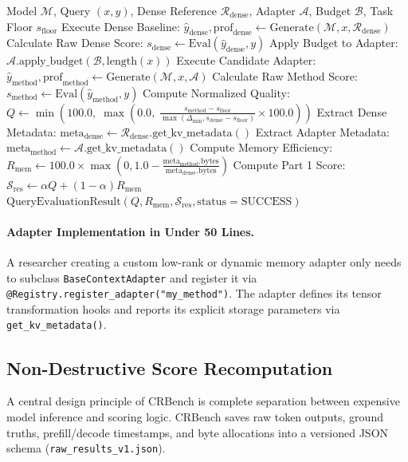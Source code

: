 \documentclass[11pt,a4paper]{article}
\begin{document}
\begin{algorithm}[h]
\caption{Atomic Query Evaluation Flow in CRBench}
\label{alg:query_eval}
\begin{algorithmic}[1]
\REQUIRE Model $\mathcal{M}$, Query $(x, y)$, Dense Reference $\mathcal{R}_{\text{dense}}$, Adapter $\mathcal{A}$, Budget $\mathcal{B}$, Task Floor $s_{\text{floor}}$
\STATE Execute Dense Baseline: $\hat{y}_{\text{dense}}, \text{prof}_{\text{dense}} \leftarrow \text{Generate}(\mathcal{M}, x, \mathcal{R}_{\text{dense}})$
\STATE Calculate Raw Dense Score: $s_{\text{dense}} \leftarrow \text{Eval}(\hat{y}_{\text{dense}}, y)$
\STATE Apply Budget to Adapter: $\mathcal{A}.\text{apply\_budget}(\mathcal{B}, \text{length}(x))$
\STATE Execute Candidate Adapter: $\hat{y}_{\text{method}}, \text{prof}_{\text{method}} \leftarrow \text{Generate}(\mathcal{M}, x, \mathcal{A})$
\STATE Calculate Raw Method Score: $s_{\text{method}} \leftarrow \text{Eval}(\hat{y}_{\text{method}}, y)$
\STATE Compute Normalized Quality: $Q \leftarrow \min\left(100.0, \; \max\left(0.0, \; \frac{s_{\text{method}} - s_{\text{floor}}}{\max(\Delta_{\min}, s_{\text{dense}} - s_{\text{floor}})} \times 100.0\right)\right)$
\STATE Extract Dense Metadata: $\text{meta}_{\text{dense}} \leftarrow \mathcal{R}_{\text{dense}}.\text{get\_kv\_metadata}()$
\STATE Extract Adapter Metadata: $\text{meta}_{\text{method}} \leftarrow \mathcal{A}.\text{get\_kv\_metadata}()$
\STATE Compute Memory Efficiency: $R_{\text{mem}} \leftarrow 100.0 \times \max\left(0, 1.0 - \frac{\text{meta}_{\text{method}}.\text{bytes}}{\text{meta}_{\text{dense}}.\text{bytes}}\right)$
\STATE Compute Part 1 Score: $\mathcal{S}_{\text{res}} \leftarrow \alpha Q + (1 - \alpha) R_{\text{mem}}$
\RETURN $\text{QueryEvaluationResult}(Q, R_{\text{mem}}, \mathcal{S}_{\text{res}}, \text{status}=\text{SUCCESS})$
\end{algorithmic}
\end{algorithm}

\paragraph{Adapter Implementation in Under 50 Lines.}
A researcher creating a custom low-rank or dynamic memory adapter only needs to subclass \texttt{BaseContextAdapter} and register it via \texttt{@Registry.register\_adapter("my\_method")}. The adapter defines its tensor transformation hooks and reports its explicit storage parameters via \texttt{get\_kv\_metadata()}.

\subsection{Non-Destructive Score Recomputation}
A central design principle of CRBench is complete separation between expensive model inference and scoring logic. CRBench saves raw token outputs, ground truths, prefill/decode timestamps, and byte allocations into a versioned JSON schema (\texttt{raw\_results\_v1.json}). 
\end{document}
